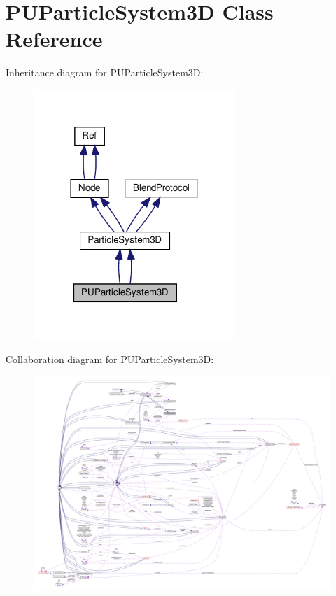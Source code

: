 \hypertarget{classPUParticleSystem3D}{}\section{P\+U\+Particle\+System3D Class Reference}
\label{classPUParticleSystem3D}


Inheritance diagram for P\+U\+Particle\+System3D\+:
\nopagebreak
\begin{figure}[H]
\begin{center}
\leavevmode
\includegraphics[width=216pt]{classPUParticleSystem3D__inherit__graph}
\end{center}
\end{figure}


Collaboration diagram for P\+U\+Particle\+System3D\+:
\nopagebreak
\begin{figure}[H]
\begin{center}
\leavevmode
\includegraphics[width=350pt]{classPUParticleSystem3D__coll__graph}
\end{center}
\end{figure}
